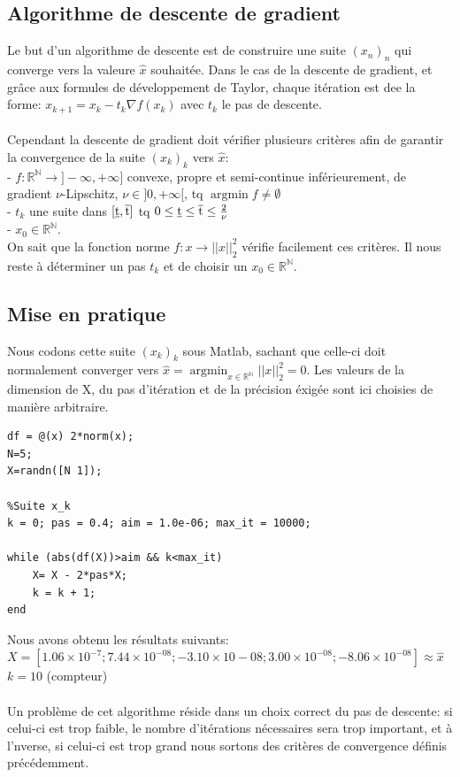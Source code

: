 \documentclass{article}
\DeclareMathOperator*{\argmin}{argmin}
\begin{document}
\subsection{Algorithme de descente de gradient}
Le but d'un algorithme de descente est de construire une suite $(x_n)_n$ qui converge vers la valeure $\hat{x}$ souhaitée. Dans le cas de la descente de gradient, et grâce aux formules de développement de Taylor, chaque itération est dee la forme: $x_{k+1} = x_k - t_k \nabla f(x_k)$   avec $t_k$ le pas de descente.\\\\
Cependant la descente de gradient doit vérifier plusieurs critères afin de garantir la convergence de la suite $(x_k)_k$ vers  $\hat{x}$:\\
- $f:\mathbb{R^N} \rightarrow ]-\infty,+\infty]$ convexe, propre et semi-continue inférieurement, de gradient $\nu$-Lipschitz, $\nu\in]0,+\infty[$, tq $\argmin f \neq \emptyset$ \\
- $t_k$ une suite dans $[\underline{\rm t},\overline{\rm t}]$ tq $0\leq\underline{\rm t} \leq \overline{\rm t} \leq \frac{2}{\nu}$ \\
- $x_0 \in \mathbb{R^N}$. \\
On sait que la fonction norme $f:x \rightarrow ||x||_2^2$ vérifie facilement ces critères. Il nous reste à déterminer un pas $t_k$ et de choisir un $x_0 \in \mathbb{R^N}$.

\subsection{Mise en pratique}
Nous codons cette suite $(x_k)_k$ sous Matlab, sachant que celle-ci doit normalement converger vers $\hat{x}  = \argmin_{x \in \mathbb{R^N}}||x||_2^2 = 0$. Les valeurs de la dimension de X, du pas d'itération et de la précision éxigée sont ici choisies de manière arbitraire.
\\
{
\color{blue}
\begin{verbatim}
df = @(x) 2*norm(x);
N=5;
X=randn([N 1]);

%Suite x_k
k = 0; pas = 0.4; aim = 1.0e-06; max_it = 10000;

while (abs(df(X))>aim && k<max_it)
    X= X - 2*pas*X;
    k = k + 1;
end

\end{verbatim}
}

Nous avons obtenu les résultats suivants:\\
$X = [1.06\times10^{-7}; 7.44\times10^{-08}; -3.10\times10-08; 3.00\times10^{-08}; -8.06\times10^{-08}] \approx  \hat{x} $\\
$k=10$ (compteur)\\ \\
Un problème de cet algorithme réside dans un choix correct du pas de descente: si celui-ci est trop faible, le nombre d'itérations nécessaires sera trop important, et à l'nverse, si celui-ci est trop grand nous sortons des critères de convergence définis précédemment.\\
\end{document}

